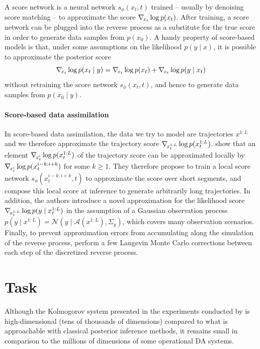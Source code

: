 A score network is a neural network $s_\phi(x_t, t)$ trained -- usually by denoising score matching \cite{hyvarinen2005estimation, vincent2011connection} -- to approximate the score $\nabla_{\!{x_t}} \log p(x_t)$. After training, a score network can be plugged into the reverse process as a substitute for the true score in order to generate data samples from $p(x_0)$. A handy property of score-based models is that, under some assumptions on the likelihood $p(y \mid x)$, it is possible to approximate the posterior score
\begin{equation}
    \nabla_{\!{x_t}} \log p(x_t \mid y) = \nabla_{\!{x_t}} \log p(x_t) + \nabla_{\!{x_t}} \log p(y \mid x_t)
\end{equation}
without retraining the score network $s_\phi(x_t, t)$, and hence to generate data samples from $p(x_0 \mid y)$.

\paragraph{Score-based data assimilation}
In score-based data assimilation, the data we try to model are trajectories $x^{1:L}$ and we therefore approximate the trajectory score $\nabla_{\!{x^{1:L}_t}} \log p(x^{1:L}_t)$. \textcite{rozet2023scorebased} show that an element $\nabla_{\!{x^{i}_t}} \log p(x^{1:L}_t)$ of the trajectory score can be approximated locally by $\nabla_{\!{x^{i}_t}} \log p(x^{i-k:i+k}_t)$ for some $k \geq 1$. They therefore propose to train a local score network $s_\phi(x^{i-k:i+k}_t, t)$ to approximate the score over short segments, and compose this local score at inference to generate arbitrarily long trajectories. In addition, the authors introduce a novel approximation for the likelihood score $\nabla_{\!{x^{1:L}_t}} \log p(y \mid x^{1:L}_t)$ in the assumption of a Gaussian observation process $p(y \mid x^{1:L}) = \mathcal{N}(y \mid \mathcal{A}(x^{1:L}), \Sigma_y)$, which covers many observation scenarios. Finally, to prevent approximation errors from accumulating along the simulation of the reverse process, \textcite{rozet2023scorebased} perform a few Langevin Monte Carlo corrections between each step of the discretized reverse process.

\section{Task}

Although the Kolmogorov system presented in the experiments conducted by \textcite{rozet2023scorebased} is high-dimensional (tens of thousands of dimensions) compared to what is approachable with classical posterior inference methods, it remains small in comparison to the millions of dimensions of some operational DA systems.

